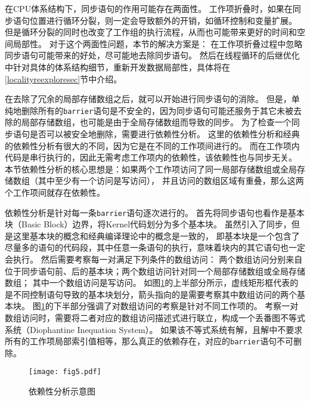 在CPU体系结构下，同步语句的作用可能存在两面性。
工作项折叠时，如果在同步语句位置进行循环分裂，则一定会导致额外的开销，如循环控制和变量扩展。
但是循环分裂的同时也改变了工作组的执行流程，从而也可能带来更好的时间和空间局部性。
对于这个两面性问题，本节的解决方案是：
在工作项折叠过程中忽略同步语句可能带来的好处，尽可能地去除同步语句。
然后在线程循环的后继优化中针对具体的体系结构细节，重新开发数据局部性，具体将在\ref{localityreexploresec}节中介绍。

在去除了冗余的局部存储数组之后，就可以开始进行同步语句的消除。
但是，单纯地删除所有的\texttt{barrier}语句是不安全的，因为同步语句可能还服务于其它未被去除的局部存储数组，也可能是由于全局存储数组而导致的同步。
为了检查一个同步语句是否可以被安全地删除，需要进行依赖性分析。
这里的依赖性分析和经典的依赖性分析有很大的不同，因为它是在不同的工作项间进行的。
而在工作项内代码是串行执行的，因此无需考虑工作项内的依赖性，该依赖性也与同步无关。
本节依赖性分析的核心思想是：如果两个工作项访问了同一局部存储数组或全局存储数组（其中至少有一个访问是写访问），
并且访问的数组区域有重叠，那么这两个工作项间就存在依赖性。

依赖性分析是针对每一条\texttt{barrier}语句逐次进行的。
首先将同步语句也看作是基本块（Basic Block）边界，将Kernel代码划分为多个基本块。
虽然引入了同步，但是这里基本块的概念和经典编译理论中的概念是一致的，
即基本块是一个包含了尽量多的语句的代码段，其中任意一条语句的执行，意味着块内的其它语句也一定会执行。
然后需要考察每一对满足下列条件的数组访问：
两个数组访问分别来自位于同步语句前、后的基本块；两个数组访问针对同一个局部存储数组或全局存储数组；
其中一个数组访问是写访问。
如图\ref{dependence}的上半部分所示，虚线矩形框代表的是不同控制语句导致的基本块划分，箭头指向的是需要考察其中数组访问的两个基本块。
图\ref{dependence}的下半部分强调了对数组访问的考察是针对不同工作项的。
考察一对数组访问时，需要将二者对应的数组访问描述式进行联立，构成一个丢番图不等式系统（Diophantine Inequation System）。
如果该不等式系统有解，且解中不要求所有的工作项局部索引值相等，那么真正的依赖存在，对应的\texttt{barrier}语句不可删除。

\begin{figure}
	\centering
	\texttt{[image: fig5.pdf]}
	\caption{依赖性分析示意图}
	\label{dependence}
\end{figure}

